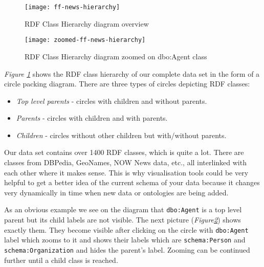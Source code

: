 \begin{figure}[h!]
    \centering
    \texttt{[image: ff-news-hierarchy]}
    \caption{RDF Class Hierarchy diagram overview}
    \label{fig:ff-news-hierarchy}
\end{figure}

\begin{figure}[h!]
    \centering
    \texttt{[image: zoomed-ff-news-hierarchy]}
    \caption{RDF Class Hierarchy diagram zoomed on dbo:Agent class}
    \label{fig:zoomed-ff-news-hierarchy}
\end{figure}
\vspace{1cm}
\textit{Figure \ref{fig:ff-news-hierarchy}} shows the RDF class hierarchy of our complete data set in the form of a circle packing diagram. There are three types of circles depicting RDF classes:
\begin{itemize}
    \item \textit{Top level parents} - circles with children and without parents.
    \item \textit{Parents} - circles with children and with parents.
    \item \textit{Children} - circles without other children but with/without parents.
\end{itemize}
Our data set contains over 1400 RDF classes, which is quite a lot. There are classes from DBPedia, GeoNames, NOW News data, etc., all interlinked with each other where it makes sense. This is why visualisation tools could be very helpful to get a better idea of the current schema of your data because it  changes very dynamically in time when new data or ontologies are being added.

As an obvious example we see on the diagram that \texttt{dbo:Agent} is a top level parent but its child labels are not visible. The next picture (\textit{Figure\ref{fig:zoomed-ff-news-hierarchy}}) shows exactly them. They become visible after clicking on the circle with \texttt{dbo:Agent} label which zooms to it and shows their labels which are \texttt{schema:Person} and \texttt{schema:Organization} and hides the parent's label. Zooming can be continued further until a child class is reached.

